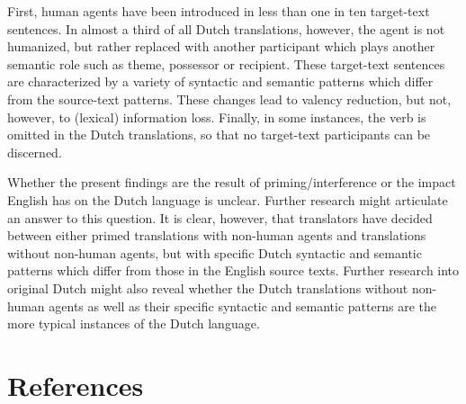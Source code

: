 \documentclass[output=paper]{LSP/langsci}
\begin{document}
First, human agents have been introduced in less than one in ten target-text sentences. In almost a third of all Dutch translations, however, the agent is not humanized, but rather replaced with another participant which plays another semantic role such as theme, possessor or recipient. These target-text sentences are characterized by a variety of syntactic and semantic patterns which differ from the source-text patterns. These changes lead to valency reduction, but not, however, to (lexical) information loss. Finally, in some instances, the verb is omitted in the Dutch translations, so that no target-text participants can be discerned. 

Whether the present findings are the result of priming/interference or the impact English has on the Dutch language \citep[see e.g.][]{House2008,Delsoir2011} is unclear. Further research might articulate an answer to this question. It is clear, however, that translators have decided between either primed translations with non-human agents and translations without non-human agents, but with specific Dutch syntactic and semantic patterns which differ from those in the English source texts. Further research into original Dutch might also reveal whether the Dutch translations without non-human agents as well as their specific syntactic and semantic patterns are the more typical instances of the Dutch language.            

\section{References}
\printbibliography[heading=subbibliography,notkeyword=this]
\end{document}
